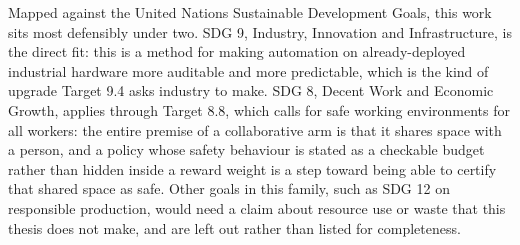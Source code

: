 Mapped against the United Nations Sustainable Development Goals, this work sits most defensibly
under two. SDG 9, Industry, Innovation and Infrastructure, is the direct fit: this is a method for
making automation on already-deployed industrial hardware more auditable and more predictable,
which is the kind of upgrade Target 9.4 asks industry to make. SDG 8, Decent Work and Economic
Growth, applies through Target 8.8, which calls for safe working environments for all workers: the
entire premise of a collaborative arm is that it shares space with a person, and a policy whose
safety behaviour is stated as a checkable budget rather than hidden inside a reward weight is a
step toward being able to certify that shared space as safe. Other goals in this family, such as
SDG 12 on responsible production, would need a claim about resource use or waste that this thesis
does not make, and are left out rather than listed for completeness.
